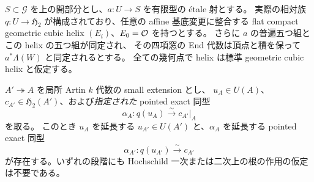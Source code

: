 \begin{theorem}
\label{thm:quintuple-chart-artin-lifting}
$S\subset\mathscr G$ を上の開部分とし、$a:U\to S$ を有限型の étale 射とする。
実際の相対族 $q:U\to\mathfrak H_2$ が構成されており、任意の affine 基底変更に整合する
flat compact geometric cubic helix $(E_i)$、$E_0=\mathcal O$ を持つとする。
さらに $a$ の普遍五つ組とこの helix の五つ組が同定され、
その四項窓の End 代数は頂点と積を保って $a^*\Lambda(W)$ と同定されるとする。
全ての幾何点で helix は標準 geometric cubic helix と仮定する。

$A'\twoheadrightarrow A$ を局所 Artin $k$ 代数の small extension とし、
$u_A\in U(A)$、$c_{A'}\in\mathfrak H_2(A')$、および\emph{指定された} pointed exact 同型
\[
 \alpha_A:q(u_A)\xrightarrow{\sim}c_{A'}|_A
\]
を取る。
このとき $u_A$ を延長する $u_{A'}\in U(A')$ と、$\alpha_A$ を延長する pointed exact 同型
\[
 \alpha_{A'}:q(u_{A'})\xrightarrow{\sim}c_{A'}
\]
が存在する。いずれの段階にも Hochschild 一次または二次上の根の作用の仮定は不要である。
\end{theorem}

